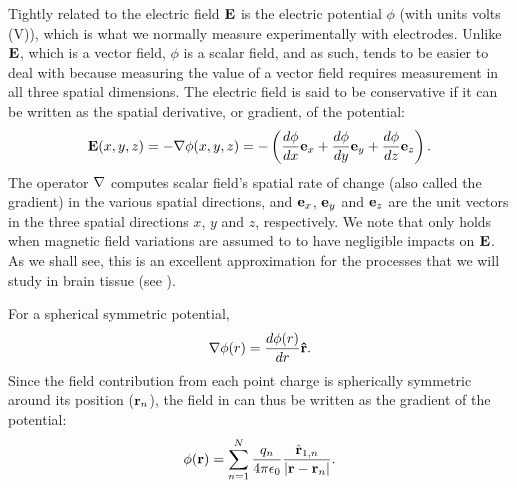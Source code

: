 Tightly related to the electric field ${\bf E}$ is the electric potential $\phi$ (with units volts (\si{\volt})), which is what we normally measure experimentally with electrodes. Unlike ${\bf E}$, which is a vector field, $\phi$ is a scalar field, and as such, tends to be easier to deal with because measuring the value of a vector field requires measurement in all three spatial dimensions. The electric field is said to be conservative if it can be written as the spatial derivative, or gradient, of the potential:
\begin{equation}
{\bf E}(x,y,z) = - {\bf \nabla} \phi(x,y,z) = - \left(\frac{d\phi}{dx} {\bf e}_x  + \frac{d\phi}{dy} {\bf e}_y + \frac{d\phi}{dz} {\bf e}_z \right).
\label{eq:Basics:EV}
\end{equation}
The operator ${\bf \nabla}$ computes scalar field's spatial rate of change (also called the gradient) in the various spatial directions, and ${\bf e}_x$, ${\bf e}_y$ and  ${\bf e}_z$ are the unit vectors in the three spatial directions $x$, $y$ and $z$, respectively. We note that  only holds when magnetic field variations are assumed to to have negligible impacts on ${\bf E}$. As we shall see, this is an excellent approximation for the processes that we will study in brain tissue (see 
).

For a spherical symmetric potential,
\begin{equation}
{\bf \nabla} \phi(r) = \frac{d\phi(r)}{dr} {\bf \hat{r}}.
\label{eq:Basics:SphericalNablaPhi}
\end{equation}
Since the field contribution from each point charge is spherically symmetric around its position (${\bf r}_n$), the field in  can thus be written as the gradient of the potential:
\begin{equation}
{\phi}({\bf r}) = \sum_{n=1}^{N}  \frac{q_n}{4\pi \epsilon_0} \frac{\hat{{\bf r}}_{1,n}}{|{\bf r}-{\bf r}_n|}.
\label{eq:Basics:CoulombPhiN}
\end{equation}


